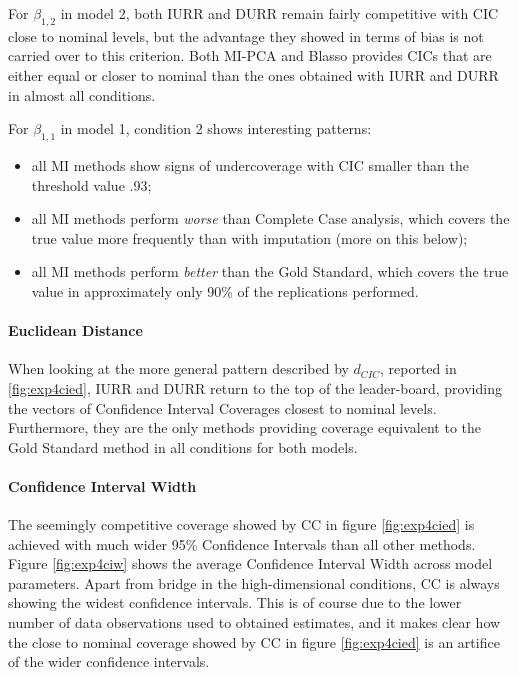 	For $\beta_{1,2}$ in model 2, both IURR and DURR remain fairly competitive with CIC close to nominal levels, but 
	the advantage they showed in terms of bias is not carried over to this criterion.
	Both MI-PCA and Blasso provides CICs that are either equal or closer to nominal than the ones obtained with
	IURR and DURR in almost all conditions.

	For $\beta_{1,1}$ in model 1, condition 2 shows interesting patterns: 
	\begin{itemize}
		\item all MI methods show signs of undercoverage with CIC smaller than the threshold value .93;
		\item all MI methods perform \emph{worse} than Complete Case analysis, which covers the true value 
			more frequently than with imputation (more on this below);
		\item all MI methods perform \emph{better} than the Gold Standard, which covers the true value 
			in approximately only 90\% of the replications performed.
	\end{itemize}
	
	\paragraph{Euclidean Distance}
	When looking at the more general pattern described by $d_{CIC}$, reported in \ref{fig:exp4cied}, IURR and DURR 
	return to the top of the leader-board, providing the vectors of Confidence Interval Coverages closest to 
	nominal levels.
	Furthermore, they are the only methods providing coverage equivalent to the Gold Standard method in all conditions
	for both models.

	\paragraph{Confidence Interval Width}
	The seemingly competitive coverage showed by CC in figure \ref{fig:exp4cied} is achieved with much wider 
	95\% Confidence Intervals than all other methods. 
	Figure \ref{fig:exp4ciw} shows the average Confidence Interval Width across model parameters.
	Apart from bridge in the high-dimensional conditions, CC is always showing the widest confidence intervals.
	This is of course due to the lower number of data observations used to obtained estimates, and it makes clear
	how the close to nominal coverage showed by CC in figure \ref{fig:exp4cied} is an artifice of the wider 
	confidence intervals.

